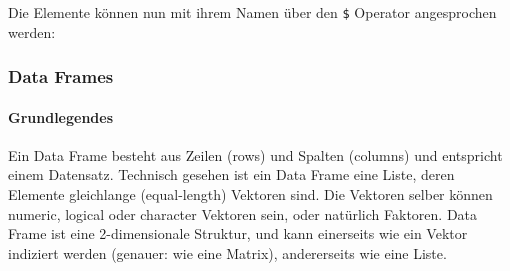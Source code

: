 \documentclass[
]{article}
\newenvironment{Shaded}{\begin{snugshade}}{\end{snugshade}}
\newcommand{\AttributeTok}[1]{\textcolor[rgb]{0.13,0.29,0.53}{#1}}
\newcommand{\CommentTok}[1]{\textcolor[rgb]{0.56,0.35,0.01}{\textit{#1}}}
\newcommand{\ConstantTok}[1]{\textcolor[rgb]{0.56,0.35,0.01}{#1}}
\newcommand{\DecValTok}[1]{\textcolor[rgb]{0.00,0.00,0.81}{#1}}
\newcommand{\FloatTok}[1]{\textcolor[rgb]{0.00,0.00,0.81}{#1}}
\newcommand{\FunctionTok}[1]{\textcolor[rgb]{0.13,0.29,0.53}{\textbf{#1}}}
\newcommand{\NormalTok}[1]{#1}
\newcommand{\OtherTok}[1]{\textcolor[rgb]{0.56,0.35,0.01}{#1}}
\newcommand{\SpecialCharTok}[1]{\textcolor[rgb]{0.81,0.36,0.00}{\textbf{#1}}}
\newcommand{\StringTok}[1]{\textcolor[rgb]{0.31,0.60,0.02}{#1}}
\begin{document}
\begin{Shaded}
\end{Shaded}

Die Elemente können nun mit ihrem Namen über den \texttt{\$} Operator
angesprochen werden:

\begin{Shaded}
\end{Shaded}

\hypertarget{data-frames}{%
\subsubsection{Data Frames}\label{data-frames}}

\hypertarget{grundlegendes-3}{%
\paragraph{Grundlegendes}\label{grundlegendes-3}}

Ein Data Frame besteht aus Zeilen (rows) und Spalten (columns) und
entspricht einem Datensatz. Technisch gesehen ist ein Data Frame eine
Liste, deren Elemente gleichlange (equal-length) Vektoren sind. Die
Vektoren selber können numeric, logical oder character Vektoren sein,
oder natürlich Faktoren. Data Frame ist eine 2-dimensionale Struktur,
und kann einerseits wie ein Vektor indiziert werden (genauer: wie eine
Matrix), andererseits wie eine Liste.
\end{document}
